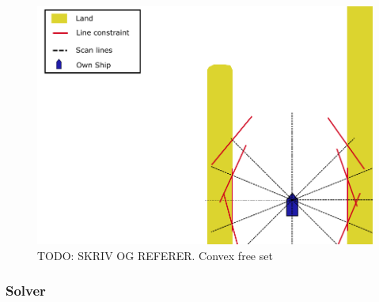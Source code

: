 \begin{figure}[ht]
    \centering
    \includegraphics[width=\textwidth]{Images/StaticObs_lines.pdf}
    \caption{TODO: SKRIV OG REFERER. Convex free set}     \label{FIG: Static Obs Lines}
\end{figure} 

\subsubsection{Solver}


\newpage